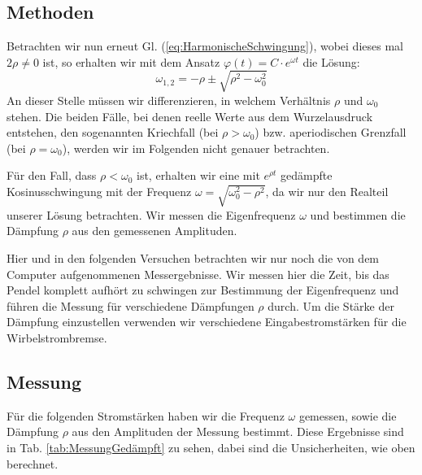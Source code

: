 \documentclass[11pt,a4paper,titlepage, ngerman]{article}
\newcommand{\refeq}[1]{Gl. (\ref{eq:#1})}
\newcommand{\reftab}[1]{Tab. \ref{tab:#1}}
\begin{document}
		\subsection*{Methoden}
			
			Betrachten wir nun erneut \refeq{HarmonischeSchwingung}, wobei dieses mal $2\rho \neq 0$ ist, so
			erhalten wir mit dem Ansatz $\varphi (t)=C\cdot e^{\omega t}$ die Lösung: 
			\begin{equation}
				\omega_{1,2}= -\rho \pm \sqrt{\rho^2-\omega_0^2} \label{eq:HarmonischeFrequenz}
			\end{equation}
			An dieser Stelle müssen wir differenzieren, in welchem Verhältnis $\rho$ und $\omega_0$ stehen.
			Die beiden Fälle, bei denen reelle Werte aus dem Wurzelausdruck entstehen, den sogenannten Kriechfall (bei $\rho > \omega_0$) bzw. aperiodischen Grenzfall (bei $\rho = \omega_0 $), werden wir im Folgenden nicht genauer betrachten. 
			
			Für den Fall, dass $\rho < \omega_0 $ ist, erhalten wir eine mit $e^{\rho t}$ gedämpfte Kosinusschwingung mit der Frequenz $\omega = \sqrt{\omega_0^2-\rho^2}$, da wir nur den Realteil unserer Lösung betrachten. Wir messen die Eigenfrequenz $\omega$ und bestimmen die Dämpfung $\rho$ aus den gemessenen Amplituden. 
						
			Hier und in den folgenden Versuchen betrachten wir nur noch die von dem Computer aufgenommenen Messergebnisse. Wir messen hier die Zeit, bis das Pendel komplett aufhört zu schwingen zur Bestimmung der Eigenfrequenz und führen die Messung für verschiedene Dämpfungen $\rho$ durch. Um die Stärke der Dämpfung einzustellen verwenden wir verschiedene Eingabestromstärken für die Wirbelstrombremse.
		
		\subsection*{Messung}
		
			Für die folgenden Stromstärken haben wir die Frequenz $\omega$ gemessen, sowie die Dämpfung $\rho$ aus den Amplituden der Messung bestimmt. Diese Ergebnisse sind in \reftab{MessungGedämpft} zu sehen, dabei sind die Unsicherheiten, wie oben berechnet.	
			
\end{document}
